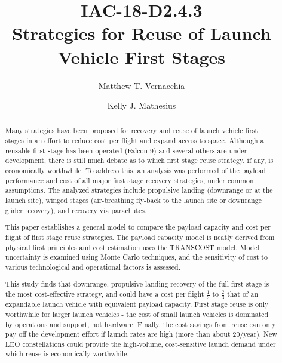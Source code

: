\documentclass{iaf-iac}
\title{\textmd{IAC-18-D2.4.3} \\ Strategies for Reuse of Launch Vehicle First Stages}
\author[1, 2, 3]{Matthew T. Vernacchia}
\author[1, 2]{Kelly J. Mathesius}
\affil[1]{Department of Aeronautics and Astronautics, Massachusetts Institute of Technology}
\affil[2]{Both authors contributed equally to this work.}
\affil[3]{Corresponding author: \textup{\href{mvernacc@mit.edu}{mvernacc@mit.edu}}}
\begin{document}
\maketitle
\saythanks

\begin{abstract}
Many strategies have been proposed for recovery and reuse of launch vehicle first stages in an effort to reduce cost per flight and expand access to space. Although a reusable first stage has been operated (Falcon 9) and several others are under development, there is still much debate as to which first stage reuse strategy, if any, is economically worthwhile. To address this, an analysis was performed of the payload performance and cost of all major first stage recovery strategies, under common assumptions. The analyzed strategies include propulsive landing (downrange or at the launch site), winged stages (air-breathing fly-back to the launch site or downrange glider recovery), and recovery via parachutes.

This paper establishes a general model to compare the payload capacity and cost per flight of first stage reuse strategies. The payload capacity model is neatly derived from physical first principles and cost estimation uses the TRANSCOST model. Model uncertainty is examined using Monte Carlo techniques, and the sensitivity of cost to various technological and operational factors is assessed.

This study finds that downrange, propulsive-landing recovery of the full first stage is the most cost-effective strategy, and could have a cost per flight $\frac{1}{3}$ to $\frac{2}{3}$ that of an expandable launch vehicle with equivalent payload capacity. First stage reuse is only worthwhile for larger launch vehicles - the cost of small launch vehicles is dominated by operations and support, not hardware. Finally, the cost savings from reuse can only pay off the development effort if launch rates are high (more than about 20/year). New LEO constellations could provide the high-volume, cost-sensitive launch demand under which reuse is economically worthwhile.
\end{abstract}
\end{document}
